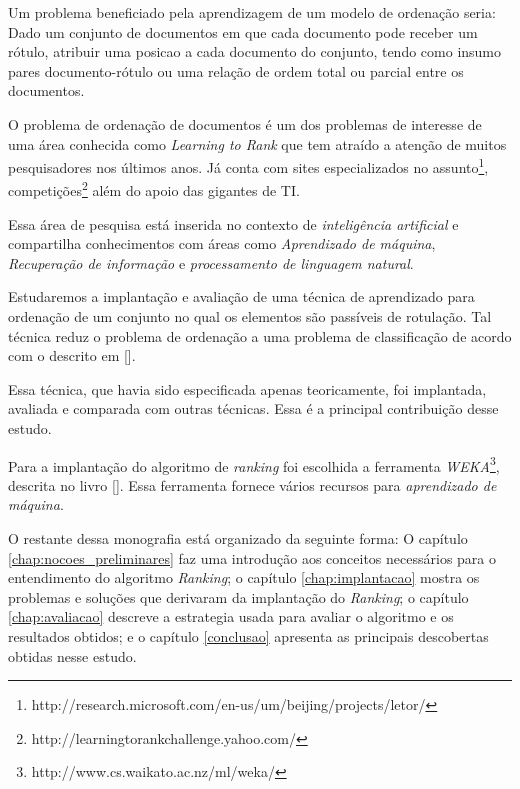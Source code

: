 Um problema beneficiado pela aprendizagem de um modelo de ordenação seria: Dado um conjunto de documentos em que cada documento pode receber um rótulo, atribuir uma posicao a cada documento do conjunto, tendo como insumo pares documento-rótulo ou uma relação de ordem total ou parcial entre os documentos.

O problema de ordenação de documentos é um dos problemas de interesse de uma área  conhecida como \emph{Learning to Rank} que tem atraído a atenção de muitos pesquisadores nos últimos anos. Já conta com sites especializados no assunto\footnote{http://research.microsoft.com/en-us/um/beijing/projects/letor/}, competições\footnote{http://learningtorankchallenge.yahoo.com/} além do apoio das gigantes de TI.

Essa área de pesquisa está inserida no contexto de \emph{inteligência artificial} e compartilha conhecimentos com áreas como \emph{Aprendizado de máquina}, \emph{Recuperação de informação} e \emph{processamento de linguagem natural}.

Estudaremos a implantação e avaliação de uma técnica de aprendizado para ordenação de um conjunto no qual os elementos são passíveis de rotulação. Tal técnica reduz o problema de ordenação a uma problema de classificação de acordo com o descrito em [\cite{langford08}].

Essa técnica, que havia sido especificada apenas teoricamente, foi implantada, avaliada e comparada com outras técnicas. Essa é a  principal contribuição desse estudo.

Para a implantação do algoritmo de \emph{ranking} foi escolhida a ferramenta \emph{WEKA}\footnote{http://www.cs.waikato.ac.nz/ml/weka/}, descrita no livro [\cite{wekabook}]. Essa ferramenta fornece vários recursos para \emph{aprendizado de máquina}.

O restante dessa monografia está organizado da seguinte forma: O capítulo \ref{chap:nocoes_preliminares} faz uma introdução aos conceitos necessários para o entendimento do algoritmo \emph{Ranking}; o capítulo \ref{chap:implantacao} mostra os problemas e soluções que derivaram da implantação do \emph{Ranking}; o capítulo \ref{chap:avaliacao} descreve a estrategia usada para avaliar o algoritmo e os resultados obtidos; e o capítulo \ref{conclusao} apresenta as principais descobertas obtidas nesse estudo.